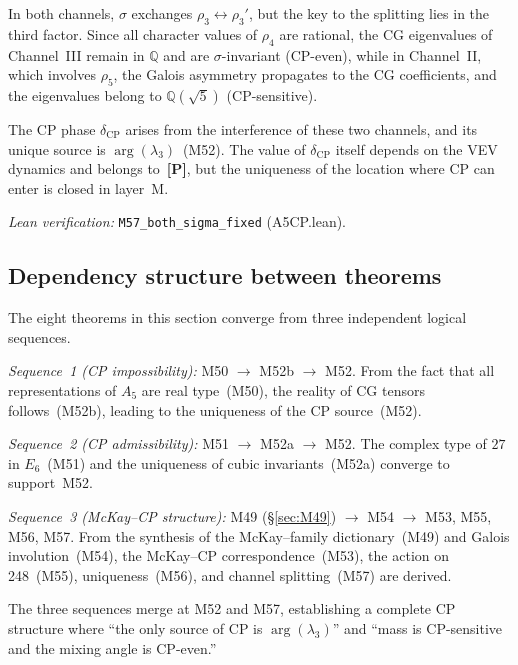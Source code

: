 \documentclass[sn-mathphys-num,Numbered]{sn-jnl}
\theoremstyle{thmstyleone}
\theoremstyle{thmstylethree}
\newcommand{\layerP}{\textbf{[P]}}
\begin{document}
In both channels, $\sigma$ exchanges $\rho_3 \leftrightarrow \rho_3'$, but the
key to the splitting lies in the third factor.  Since all character values of
$\rho_4$ are rational, the CG eigenvalues of Channel~III remain in
$\mathbb{Q}$ and are $\sigma$-invariant (CP-even), while in Channel~II, which
involves $\rho_5$, the Galois asymmetry propagates to the CG coefficients, and
the eigenvalues belong to $\mathbb{Q}(\sqrt{5})$ (CP-sensitive).

The CP phase $\delta_{\mathrm{CP}}$ arises from the interference of these two
channels, and its unique source is $\arg(\lambda_3)$~(M52).  The value of
$\delta_{\mathrm{CP}}$ itself depends on the VEV dynamics and belongs
to~\layerP, but the uniqueness of the location where CP can enter is closed in
layer~M.

\noindent\textit{Lean verification:}
\texttt{M57\_both\_sigma\_fixed} (A5CP.lean).


\subsection{Dependency structure between theorems}\label{sec:CP-dependency}

The eight theorems in this section converge from three independent logical
sequences.

\emph{Sequence~1 (CP impossibility):}
M50 $\to$ M52b $\to$ M52.  From the fact that all representations of $A_5$
are real type~(M50), the reality of CG tensors follows~(M52b), leading to the
uniqueness of the CP source~(M52).

\emph{Sequence~2 (CP admissibility):}
M51 $\to$ M52a $\to$ M52.  The complex type of $27$ in $E_6$~(M51) and the
uniqueness of cubic invariants~(M52a) converge to support~M52.

\emph{Sequence~3 (McKay--CP structure):}
M49 (\S\ref{sec:M49}) $\to$ M54 $\to$ M53, M55, M56, M57.  From the
synthesis of the McKay--family dictionary~(M49) and Galois involution~(M54),
the McKay--CP correspondence~(M53), the action on 248~(M55), uniqueness~(M56),
and channel splitting~(M57) are derived.

The three sequences merge at M52 and M57, establishing a complete CP structure
where ``the only source of CP is $\arg(\lambda_3)$'' and ``mass is
CP-sensitive and the mixing angle is CP-even.''


\end{document}
